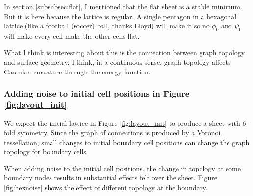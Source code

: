 \documentclass[draft]{article}
\begin{document}
In section \ref{subsubsec:flat}, I mentioned that the flat sheet is a stable minimum. But it is here because the lattice is regular. A single pentagon in a hexagonal lattice (like a football (soccer) ball, thanks Lloyd) will make it so no $\phi_0$ and $\psi_0$ will make every cell make the other cells flat. 

What I think is interesting about this is the connection between graph topology and surface geometry. I think, in a continuous sense, graph topology affects Gaussian curvature through the energy function. 

\subsubsection{Adding noise to initial cell positions in Figure \ref{fig:layout_init}}

We expect the initial lattice in Figure \ref{fig:layout_init} to produce a sheet with 6-fold symmetry. Since the graph of connections is produced by a Voronoi tessellation, small changes to initial boundary cell positions can change the graph topology for boundary cells. 

When adding noise to the initial cell positions, the change in topology at some boundary nodes results in substantial effects felt over the sheet. Figure \ref{fig:hexnoise} shows the effect of different topology at the boundary.
\end{document}
